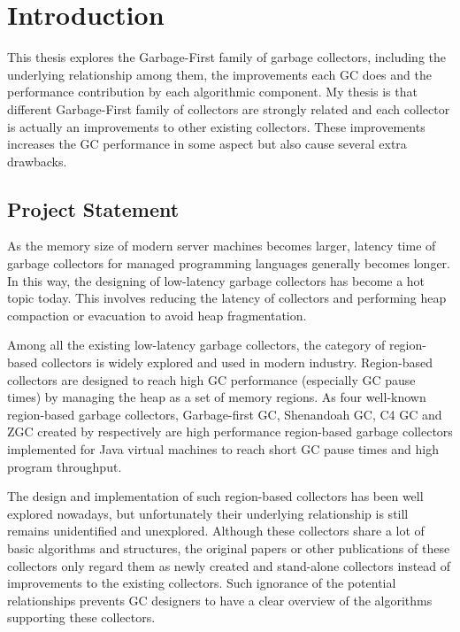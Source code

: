 \chapter{Introduction}
\label{cha:intro}

This thesis explores the Garbage-First family of garbage collectors, including
the underlying relationship among them, the improvements each GC does and the performance
contribution by each algorithmic component.
My thesis is that different Garbage-First family of collectors are strongly related
and each collector is actually an improvements to other existing collectors.
These improvements increases the GC performance in some aspect but also cause several extra drawbacks.

\section{Project Statement}

As the memory size of modern server machines becomes larger, latency time of
garbage collectors for managed programming languages generally becomes longer.
In this way, the designing of low-latency garbage collectors has become
a hot topic today. This involves reducing the latency of collectors and
performing heap compaction or evacuation to avoid heap fragmentation.

Among all the existing low-latency garbage collectors, the category of region-based
collectors is widely explored and used in modern industry.
Region-based collectors are designed to reach high GC
performance (especially GC pause times) by managing the heap as a set of memory regions.
As four well-known region-based garbage collectors,
Garbage-first GC, Shenandoah GC, C4 GC and ZGC created by
\citep{detlefs2004garbage,flood2016shenandoah,tene2011c4,liden_karlsson_2018} respectively
are high performance region-based garbage collectors implemented for Java virtual machines
to reach short GC pause times and high program throughput.

The design and implementation of such region-based collectors has been well
explored nowadays, but unfortunately their underlying relationship is still remains unidentified and unexplored.
Although these collectors share a lot of basic algorithms and structures,
the original papers or other publications of these collectors only regard them as
newly created and stand-alone collectors instead of improvements to the existing collectors.
Such ignorance of the potential relationships prevents GC designers to have a clear
overview of the algorithms supporting these collectors.

